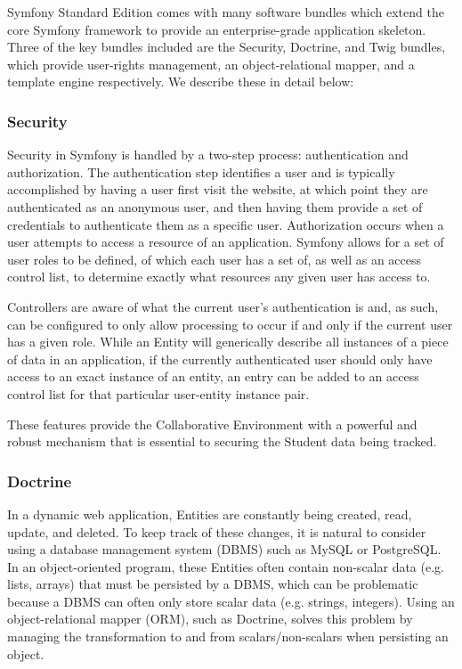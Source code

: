Symfony Standard Edition comes with many software bundles which extend the core Symfony framework to provide an enterprise-grade application skeleton. Three of the key bundles included are the Security, Doctrine, and Twig bundles, which provide user-rights management, an object-relational mapper, and a template engine respectively. We describe these in detail below:

\subsubsection{Security}
Security in Symfony is handled by a two-step process: authentication and authorization. The authentication step identifies a user and is typically accomplished by having a user first visit the website, at which point they are authenticated as an anonymous user, and then having them provide a set of credentials to authenticate them as a specific user. Authorization occurs when a user attempts to access a resource of an application. Symfony allows for a set of user roles to be defined, of which each user has a set of, as well as an access control list, to determine exactly what resources any given user has access to.

Controllers are aware of what the current user's authentication is and, as such, can be configured to only allow processing to occur if and only if the current user has a given role. While an Entity will generically describe all instances of a piece of data in an application, if the currently authenticated user should only have access to an exact instance of an entity, an entry can be added to an access control list for that particular user-entity instance pair.

These features provide the Collaborative Environment with a powerful and robust mechanism that is essential to securing the Student data being tracked.

\subsubsection{Doctrine}
In a dynamic web application, Entities are constantly being created, read, update, and deleted. To keep track of these changes, it is natural to consider using a database management system (DBMS) such as MySQL or PostgreSQL. In an object-oriented program, these Entities often contain non-scalar data (e.g. lists, arrays) that must be persisted by a DBMS, which can be problematic because a DBMS can often only store scalar data (e.g. strings, integers). Using an object-relational mapper (ORM), such as Doctrine, solves this problem by managing the transformation to and from scalars/non-scalars when persisting an object.

